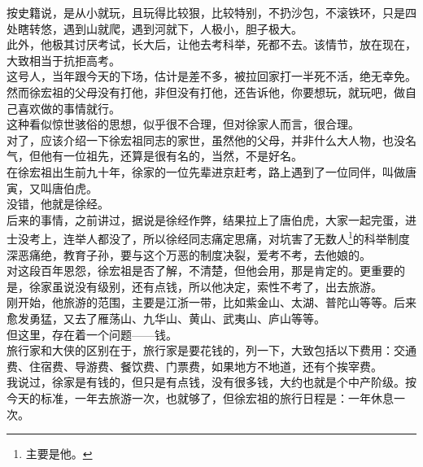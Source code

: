 \begin{multicols}{\theparacolNo}
按史籍说，是从小就玩，且玩得比较狠，比较特别，不扔沙包，不滚铁环，只是四处瞎转悠，遇到山就爬，遇到河就下，人极小，胆子极大。\\

此外，他极其讨厌考试，长大后，让他去考科举，死都不去。该情节，放在现在，大致相当于抗拒高考。\\

这号人，当年跟今天的下场，估计是差不多，被拉回家打一半死不活，绝无幸免。\\

然而徐宏祖的父母没有打他，非但没有打他，还告诉他，你要想玩，就玩吧，做自己喜欢做的事情就行。\\

这种看似惊世骇俗的思想，似乎很不合理，但对徐家人而言，很合理。\\

对了，应该介绍一下徐宏祖同志的家世，虽然他的父母，并非什么大人物，也没名气，但他有一位祖先，还算是很有名的，当然，不是好名。\\

在徐宏祖出生前九十年，徐家的一位先辈进京赶考，路上遇到了一位同伴，叫做唐寅，又叫唐伯虎。\\

没错，他就是徐经。\\

后来的事情，之前讲过，据说是徐经作弊，结果拉上了唐伯虎，大家一起完蛋，进士没考上，连举人都没了，所以徐经同志痛定思痛，对坑害了无数人\footnote{主要是他。}的科举制度深恶痛绝，教育子孙，要与这个万恶的制度决裂，爱考不考，去他娘的。\\

对这段百年恩怨，徐宏祖是否了解，不清楚，但他会用，那是肯定的。更重要的是，徐家虽说没有级别，还有点钱，所以他决定，索性不考了，出去旅游。\\

刚开始，他旅游的范围，主要是江浙一带，比如紫金山、太湖、普陀山等等。后来愈发勇猛，又去了雁荡山、九华山、黄山、武夷山、庐山等等。\\

但这里，存在着一个问题——钱。\\

旅行家和大侠的区别在于，旅行家是要花钱的，列一下，大致包括以下费用：交通费、住宿费、导游费、餐饮费、门票费，如果地方不地道，还有个挨宰费。\\

我说过，徐家是有钱的，但只是有点钱，没有很多钱，大约也就是个中产阶级。按今天的标准，一年去旅游一次，也就够了，但徐宏祖的旅行日程是：一年休息一次。\\


\end{multicols}
